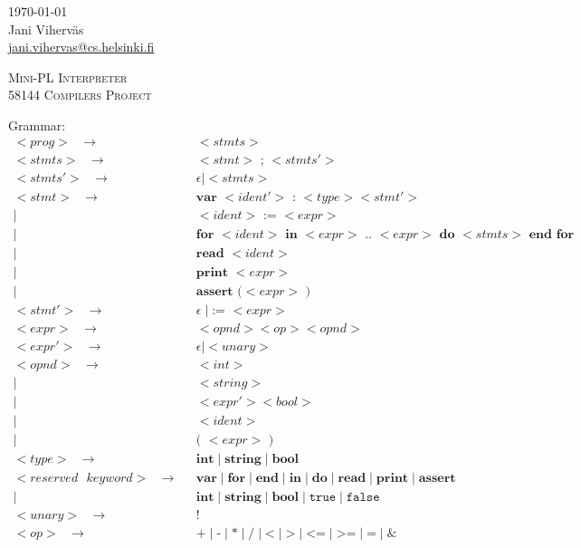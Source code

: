 \documentclass[a4paper,12pt]{article}
\author{Jani Viherväs}
\newcommand{\bb}[1]{\textbf{#1}}
\newcommand{\ttt}[1]{\texttt{#1}}
\newcommand{\e}{\epsilon}
\newcommand{\s}{\ttt{ }}
\begin{document}
\begin{flushright}
\today \\
\vspace{1em}
Jani Viherväs\\ 
\href{mailto:jani.vihervas@cs.helsinki.fi}{jani.vihervas@cs.helsinki.fi}
\end{flushright}

\vfill

\begin{center}
\textsc{\LARGE Mini-PL Interpreter} \\
\vspace{1em}
\textsc{\large 58144 Compilers Project}
\end{center}

\vfill

Grammar:
\begin{align*}
<prog>\s \to \s &<stmts> \\
<stmts>\s \to \s &<stmt> \bb{ ; } <stmts'> \\
<stmts'>\s \to \s &\e \mid <stmts> \\
<stmt>\s \to \s &\bb{var } <ident'> \bb{ : } <type> <stmt'> \\ 
       \mid \s &<ident> \bb{ := } <expr> \\  
       \mid \s &\bb{for } <ident> \bb{ in } <expr> \bb{ .. } <expr> \bb{ do } 
             <stmts> \bb{ end } \bb{for} \\
       \mid \s &\bb{read } <ident> \\
       \mid \s &\bb{print } <expr> \\
       \mid \s &\bb{assert (}  <expr> \bb{ )} \\
<stmt'>\s \to \s &\e \mid \bb{:= } <expr> \\
<expr>\s \to \s &<opnd> <op> <opnd> \\
<expr'>\s \to \s &\e \mid <unary> \\
<opnd>\s \to \s &<int> \\
       \mid \s &<string> \\
       \mid \s &<expr'><bool> \\
       \mid \s &<ident> \\
       \mid \s &\bb{( } <expr> \bb{ )} \\
<type>\s \to \s &\bb{int} \mid \bb{string} \mid \bb{bool} \\
<reserved\s keyword>\s \to \s 
              &\bb{var} \mid \bb{for} \mid \bb{end} \mid \bb{in} \mid \bb{do}
              \mid \bb{read} \mid \bb{print} \mid \bb{assert} \\ 
              \mid \s &\bb{int} \mid \bb{string} \mid \bb{bool}  \mid \ttt{true} \mid \ttt{false}\\
<unary>\s \to \s &\bb{!} \\
<op>\s \to \s &\bb{+} \mid \bb{-} \mid \bb{*} \mid \bb{/} \mid \bb{<} \mid
\bb{>} \mid \bb{<=} \mid \bb{>=} \mid \bb{=} \mid \bb{\&}
\end{align*}
\end{document}
